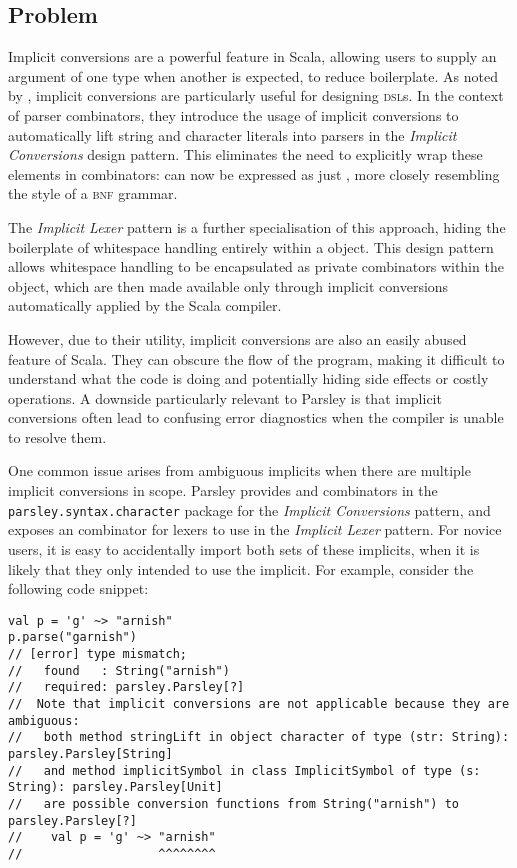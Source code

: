 \documentclass[../../main.tex]{subfiles}
\begin{document}
\subsection*{Problem}

Implicit conversions are a powerful feature in Scala, allowing users to supply an argument of one type when another is expected, to reduce boilerplate.
As noted by \textcite{willis_design_2022}, implicit conversions are particularly useful for designing \textsc{dsl}s.
In the context of parser combinators, they introduce the usage of implicit conversions to automatically lift string and character literals into parsers in the \emph{Implicit Conversions} design pattern.
This eliminates the need to explicitly wrap these elements in combinators:
 can now be expressed as just , more closely resembling the style of a \textsc{bnf} grammar.

The \emph{Implicit Lexer} pattern is a further specialisation of this approach, hiding the boilerplate of whitespace handling entirely within a  object.
This design pattern allows whitespace handling to be encapsulated as private combinators within the  object, which are then made available only through implicit conversions automatically applied by the Scala compiler.

However, due to their utility, implicit conversions are also an easily abused feature of Scala.
They can obscure the flow of the program, making it difficult to understand what the code is doing and potentially hiding side effects or costly operations.
A downside particularly relevant to Parsley is that implicit conversions often lead to confusing error diagnostics when the compiler is unable to resolve them.

One common issue arises from ambiguous implicits when there are multiple implicit conversions in scope.
Parsley provides  and  combinators in the \texttt{parsley.syntax.character} package for the \emph{Implicit Conversions} pattern,
and exposes an  combinator for lexers to use in the \emph{Implicit Lexer} pattern.
For novice users, it is easy to accidentally import both sets of these implicits, when it is likely that they only intended to use the  implicit. %
For example, consider the following code snippet:
\begin{verbatim}
val p = 'g' ~> "arnish"
p.parse("garnish")
// [error] type mismatch;
//   found   : String("arnish")
//   required: parsley.Parsley[?]
//  Note that implicit conversions are not applicable because they are ambiguous:
//   both method stringLift in object character of type (str: String): parsley.Parsley[String]
//   and method implicitSymbol in class ImplicitSymbol of type (s: String): parsley.Parsley[Unit]
//   are possible conversion functions from String("arnish") to parsley.Parsley[?]
//    val p = 'g' ~> "arnish"
//                   ^^^^^^^^
\end{verbatim}
\end{document}
